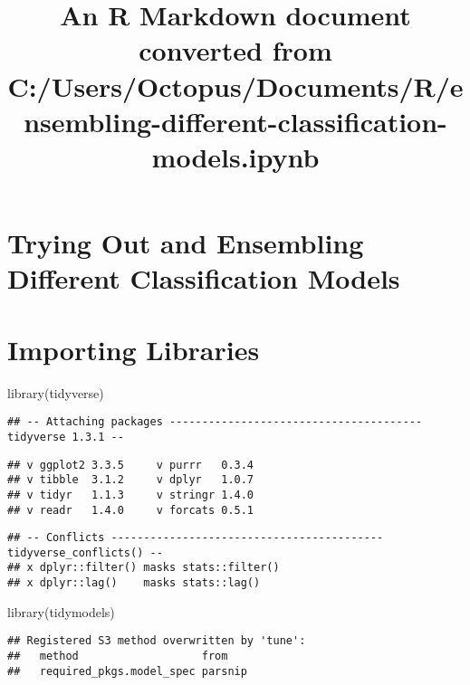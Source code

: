 \documentclass[
]{article}
\title{An R Markdown document converted from
C:/Users/Octopus/Documents/R/ensembling-different-classification-models.ipynb}
\author{}
\date{\vspace{-2.5em}}
\newenvironment{Shaded}{\begin{snugshade}}{\end{snugshade}}
\newcommand{\FunctionTok}[1]{\textcolor[rgb]{0.00,0.00,0.00}{#1}}
\newcommand{\NormalTok}[1]{#1}
\begin{document}
\maketitle

\hypertarget{trying-out-and-ensembling-different-classification-models}{%
\section{Trying Out and Ensembling Different Classification
Models}\label{trying-out-and-ensembling-different-classification-models}}

\hypertarget{importing-libraries}{%
\section{Importing Libraries}\label{importing-libraries}}

\begin{Shaded}
\begin{Highlighting}[]
\FunctionTok{library}\NormalTok{(tidyverse)}
\end{Highlighting}
\end{Shaded}

\begin{verbatim}
## -- Attaching packages --------------------------------------- tidyverse 1.3.1 --
\end{verbatim}

\begin{verbatim}
## v ggplot2 3.3.5     v purrr   0.3.4
## v tibble  3.1.2     v dplyr   1.0.7
## v tidyr   1.1.3     v stringr 1.4.0
## v readr   1.4.0     v forcats 0.5.1
\end{verbatim}

\begin{verbatim}
## -- Conflicts ------------------------------------------ tidyverse_conflicts() --
## x dplyr::filter() masks stats::filter()
## x dplyr::lag()    masks stats::lag()
\end{verbatim}

\begin{Shaded}
\begin{Highlighting}[]
\FunctionTok{library}\NormalTok{(tidymodels)}
\end{Highlighting}
\end{Shaded}

\begin{verbatim}
## Registered S3 method overwritten by 'tune':
##   method                   from   
##   required_pkgs.model_spec parsnip
\end{verbatim}
\end{document}
